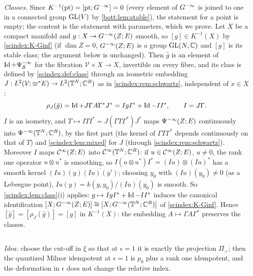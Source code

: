\emph{Classes.} Since $K^{-1}(\mathrm{pt})=[\mathrm{pt};G^{-\infty}]=0$ (every element of
$G^{-\infty}$ is joined to one in a connected group $\operatorname{GL}(V)$ by \cref{bott:lem:stable}),
the statement for a point is empty; the content is the statement with parameters,
which we prove. Let $X$ be a compact manifold and $g:X\to G^{-\infty}(Z;E)$ smooth, so
$[g]\in K^{-1}(X)$ by \ref{scindex:K-Ginf} (if $\dim Z=0$, $G^{-\infty}(Z;E)$ is a group $\operatorname{GL}(N,\mathbb{C})$ and $[g]$ is its stable class; the argument below is unchanged). Then
$\hat g$ is an element of $\operatorname{Id}+\Psi^{-\infty}_{\mathcal S}$ for the fibration
$\mathcal V\times X\to X$, invertible on every fibre, and its class is defined by
\cref{scindex:def:class} through an isometric embedding $J:L^2(\mathcal V;\varpi^*E)\to
L^2(\mathbb{T}^N;\mathbb{C}^R)$ as in \cref{scindex:rem:schwartz}, independent of $x\in X$:
\begin{equation*}
  \rho_J(\hat g)=\operatorname{Id}+J\Gamma A\Gamma^*J^*=IgI^*+\operatorname{Id}-II^*,\qquad I=J\Gamma .
\end{equation*}
$I$ is an isometry, and $T\mapsto ITI^*=J(\Gamma T\Gamma^*)J^*$ maps
$\Psi^{-\infty}(Z;E)$ continuously into $\Psi^{-\infty}(\mathbb{T}^N;\mathbb{C}^R)$, by the
first part (the kernel of $\Gamma T\Gamma^*$ depends continuously on that of $T$)
and \cref{scindex:lem:mixed} for $J$ (through \cref{scindex:rem:schwartz}).
Moreover $I$ maps $\mathcal{C}^\infty(Z;E)$ into
$\mathcal{C}^\infty(\mathbb{T}^N;\mathbb{C}^R)$: if $u\in\mathcal{C}^\infty(Z;E)$, $u\ne0$, the rank one operator
$u\otimes u^*$ is smoothing, so $I(u\otimes u^*)I^*=(Iu)\otimes(Iu)^*$ has a smooth
kernel $(Iu)(y)\overline{(Iu)(y')}$; choosing $y_0$ with $(Iu)(y_0)\ne0$ (as a
Lebesgue point), $Iu(y)=k(y,y_0)/\overline{(Iu)(y_0)}$ is smooth. So
\cref{scindex:lem:class}(i) applies: $g\mapsto IgI^*+\operatorname{Id}-II^*$ induces the
canonical identification $[X;G^{-\infty}(Z;E)]\cong[X;G^{-\infty}(\mathbb{T}^N;\mathbb{C}^R)]$ of
\ref{scindex:K-Ginf}. Hence $[\hat g]=[\rho_J(\hat g)]=[g]$ in $K^{-1}(X)$: the
embedding $A\mapsto\Gamma A\Gamma^*$ preserves the classes.

\subsection*{}

\emph{Idea:} choose the cut-off in $\xi$ so that at $\epsilon=1$ it is exactly the
projection $\Pi_>$; then the quantized Milnor idempotent at $\epsilon=1$ is $p_0$
plus a rank one idempotent, and the deformation in $\epsilon$ does not change the
relative index.

